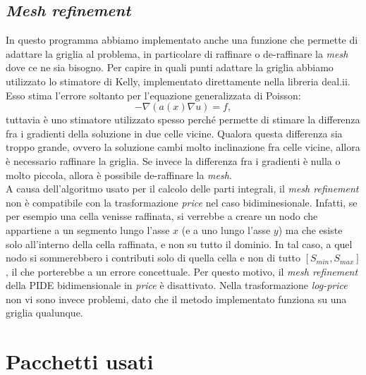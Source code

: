 \documentclass[a4paper,10pt]{report}
\theoremstyle{plain}
\theoremstyle{definition}
\theoremstyle{remark}
\begin{document}
\section{\emph{Mesh refinement}}
In questo programma abbiamo implementato anche una funzione che permette di adattare la griglia al problema, in particolare di raffinare o de-raffinare la \emph{mesh} dove ce ne sia bisogno. Per capire in quali punti adattare la griglia abbiamo utilizzato lo stimatore di Kelly, implementato direttamente nella libreria \textsf{deal.ii}. Esso stima l'errore soltanto per l'equazione generalizzata di Poisson: $$-\nabla\left(a(x)\nabla u\right)=f,$$tuttavia \`e uno stimatore utilizzato spesso perch\'e permette di stimare la differenza fra i gradienti della soluzione in due celle vicine. Qualora questa differenza sia troppo grande, ovvero la soluzione cambi molto inclinazione fra celle vicine, allora \`e necessario raffinare la griglia. Se invece la differenza fra i gradienti \`e nulla o molto piccola, allora \`e possibile de-raffinare la \emph{mesh}.\\
A causa dell'algoritmo usato per il calcolo delle parti integrali, il \emph{mesh refinement} non è compatibile con la trasformazione \emph{price} nel caso bidiminesionale. Infatti, se per esempio una cella venisse raffinata, si verrebbe a creare un nodo che appartiene a un segmento lungo l'asse $x$ (e a uno lungo l'asse $y$) ma che esiste solo all'interno della cella raffinata, e non su tutto il dominio. In tal caso, a quel nodo si sommerebbero i contributi solo di quella cella e non di tutto $[S_{min},S_{max}]$, il che porterebbe a un errore concettuale. Per questo motivo, il \emph{mesh refinement} della PIDE bidimensionale in \emph{price} \`e disattivato. Nella trasformazione \emph{log-price} non vi sono invece problemi, dato che il metodo implementato funziona su una griglia qualunque.

\chapter{Pacchetti usati}
\end{document}
